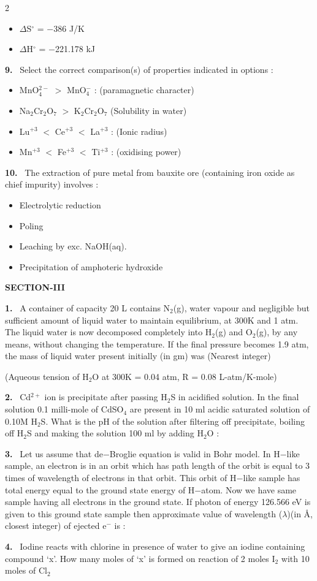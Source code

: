 \documentclass[10pt]{extarticle}
\newcommand{\sect}[1]{\par\smallskip\noindent\textbf{#1}\par}
\newcommand{\qn}[1]{\par\smallskip\noindent\textbf{#1.}~}
\newenvironment{qoptions}{\begin{itemize}[leftmargin=1.8em,itemsep=1pt,topsep=2pt,label={}]}{\end{itemize}}
\newcommand{\opt}[2]{\item[(#1)] #2}
\begin{document}
\begin{multicols}{2}
\begin{qoptions}
\opt{C}{$\Delta$S$^\circ$ = $-$386 J/K}
\opt{D}{$\Delta$H$^\circ$ = $-$221.178 kJ}
\end{qoptions}
\qn{9} Select the correct comparison(s) of properties indicated in options :
\begin{qoptions}
\opt{A}{MnO$_4^{2-}$ $>$ MnO$_4^-$ : (paramagnetic character)}
\opt{B}{Na$_2$Cr$_2$O$_7$ $>$ K$_2$Cr$_2$O$_7$ (Solubility in water)}
\opt{C}{Lu$^{+3}$ $<$ Ce$^{+3}$ $<$ La$^{+3}$ : (Ionic radius)}
\opt{D}{Mn$^{+3}$ $<$ Fe$^{+3}$ $<$ Ti$^{+3}$ : (oxidising power)}
\end{qoptions}
\qn{10} The extraction of pure metal from bauxite ore (containing iron oxide as chief impurity) involves :
\begin{qoptions}
\opt{A}{Electrolytic reduction}
\opt{B}{Poling}
\opt{C}{Leaching by exc. NaOH(aq).}
\opt{D}{Precipitation of amphoteric hydroxide}
\end{qoptions}
\sect{SECTION-III}
\qn{1} A container of capacity 20 L contains N$_2$(g), water vapour and negligible but sufficient amount of liquid water to maintain equilibrium, at 300K and 1 atm. The liquid water is now decomposed completely into H$_2$(g) and O$_2$(g), by any means, without changing the temperature. If the final pressure becomes 1.9 atm, the mass of liquid water present initially (in gm) was (Nearest integer)\par
(Aqueous tension of H$_2$O at 300K = 0.04 atm, R = 0.08 L-atm/K-mole)
\qn{2} Cd$^{2+}$ ion is precipitate after passing H$_2$S in acidified solution. In the final solution 0.1 milli-mole of CdSO$_4$ are present in 10 ml acidic saturated solution of 0.10M H$_2$S. What is the pH of the solution after filtering off precipitate, boiling off H$_2$S and making the solution 100 ml by adding H$_2$O :\par
[K$_\mathrm{sp}$ of CdS = 10$^{-28}$, For H$_2$S : K$_{\mathrm a_1}$ = 10$^{-9}$, K$_{\mathrm a_2}$ = 10$^{-20}$]
\qn{3} Let us assume that de$-$Broglie equation is valid in Bohr model. In H$-$like sample, an electron is in an orbit which has path length of the orbit is equal to 3 times of wavelength of electrons in that orbit. This orbit of H$-$like sample has total energy equal to the ground state energy of H$-$atom. Now we have same sample having all electrons in the ground state. If photon of energy 126.566 eV is given to this ground state sample then approximate value of wavelength ($\lambda$)(in \AA, closest integer) of ejected e$^-$ is :
\qn{4} Iodine reacts with chlorine in presence of water to give an iodine containing compound `x'. How many moles of `x' is formed on reaction of 2 moles I$_2$ with 10 moles of Cl$_2$

\end{multicols}
\end{document}
